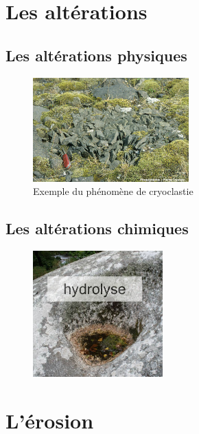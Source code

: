 \documentclass{beamer}
\begin{document}
\section{Les altérations}
\subsection{Les altérations physiques}
\begin{frame}
  \begin{center}
    \begin{figure}
      \includegraphics[width=6cm]{Images/Diapos/Alteration/Physique/cryoclastie.jpg}
      \caption{Exemple du phénomène de cryoclastie}
    \end{figure}
  \end{center}
\end{frame}

\subsection{Les altérations chimiques}
\begin{frame}
  \begin{center}
    \begin{figure}
      \includegraphics[width=5cm]{Images/Diapos/Alteration/Chimiques/hydrolyse.jpeg}
    \end{figure}
  \end{center}
\end{frame}

\section{L'érosion}
\end{document}
